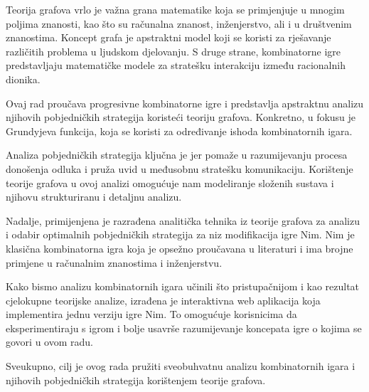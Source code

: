 Teorija grafova vrlo je važna grana matematike koja se primjenjuje u mnogim poljima znanosti, kao što su računalna znanost, inženjerstvo, ali i u društvenim znanostima. Koncept grafa je apstraktni model koji se koristi za rješavanje različitih problema u ljudskom djelovanju. S druge strane, kombinatorne igre predstavljaju matematičke modele za stratešku interakciju između racionalnih dionika.

Ovaj rad proučava progresivne kombinatorne igre i predstavlja apstraktnu analizu njihovih pobjedničkih strategija koristeći teoriju grafova. Konkretno, u fokusu je Grundyjeva funkcija, koja se koristi za određivanje ishoda kombinatornih igara.

Analiza pobjedničkih strategija ključna je jer pomaže u razumijevanju procesa donošenja odluka i pruža uvid u međusobnu stratešku komunikaciju. Korištenje teorije grafova u ovoj analizi omogućuje nam modeliranje složenih sustava i njihovu strukturiranu i detaljnu analizu.

Nadalje, primijenjena je razrađena analitička tehnika iz teorije grafova za analizu i odabir optimalnih pobjedničkih strategija za niz modifikacija igre Nim. Nim je klasična kombinatorna igra koja je opsežno proučavana u literaturi i ima brojne primjene u računalnim znanostima i inženjerstvu.

Kako bismo analizu kombinatornih igara učinili što pristupačnijom i kao rezultat cjelokupne teorijske analize, izrađena je interaktivna web aplikacija koja implementira jednu verziju igre Nim. To omogućuje korisnicima da eksperimentiraju s igrom i bolje usavrše razumijevanje koncepata igre o kojima se govori u ovom radu.

Sveukupno, cilj je ovog rada pružiti sveobuhvatnu analizu kombinatornih igara i njihovih pobjedničkih strategija korištenjem teorije grafova.
